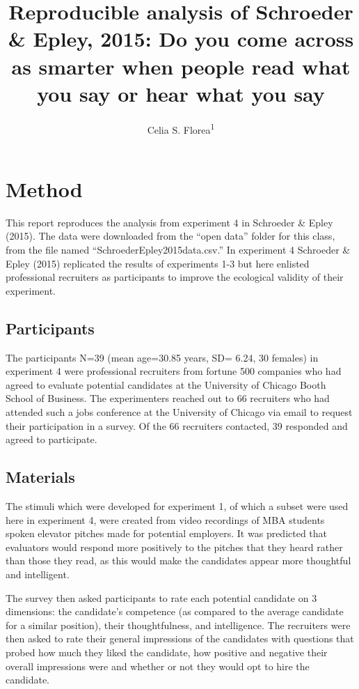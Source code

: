 \documentclass[
  english,
  man]{apa6}
\title{Reproducible analysis of Schroeder \& Epley, 2015: Do you come across as smarter when people read what you say or hear what you say}
\author{Celia S. Florea\textsuperscript{1}}
\date{}
\affiliation{\vspace{0.5cm}\textsuperscript{1} Brooklyn College of the City University of New York}
\begin{document}
\maketitle

\hypertarget{method}{%
\section{Method}\label{method}}

This report reproduces the analysis from experiment 4 in Schroeder \& Epley (2015). The data were downloaded from the ``open data'' folder for this class, from the file named ``SchroederEpley2015data.csv.'' In experiment 4 Schroeder \& Epley (2015) replicated the results of experiments 1-3 but here enlisted professional recruiters as participants to improve the ecological validity of their experiment.

\hypertarget{participants}{%
\subsection{Participants}\label{participants}}

The participants N=39 (mean age=30.85 years, SD= 6.24, 30 females) in experiment 4 were professional recruiters from fortune 500 companies who had agreed to evaluate potential candidates at the University of Chicago Booth School of Business. The experimenters reached out to 66 recruiters who had attended such a jobs conference at the University of Chicago via email to request their participation in a survey. Of the 66 recruiters contacted, 39 responded and agreed to participate.

\hypertarget{materials}{%
\subsection{Materials}\label{materials}}

The stimuli which were developed for experiment 1, of which a subset were used here in experiment 4, were created from video recordings of MBA students spoken elevator pitches made for potential employers. It was predicted that evaluators would respond more positively to the pitches that they heard rather than those they read, as this would make the candidates appear more thoughtful and intelligent.

The survey then asked participants to rate each potential candidate on 3 dimensions: the candidate's competence (as compared to the average candidate for a similar position), their thoughtfulness, and intelligence. The recruiters were then asked to rate their general impressions of the candidates with questions that probed how much they liked the candidate, how positive and negative their overall impressions were and whether or not they would opt to hire the candidate.
\end{document}
